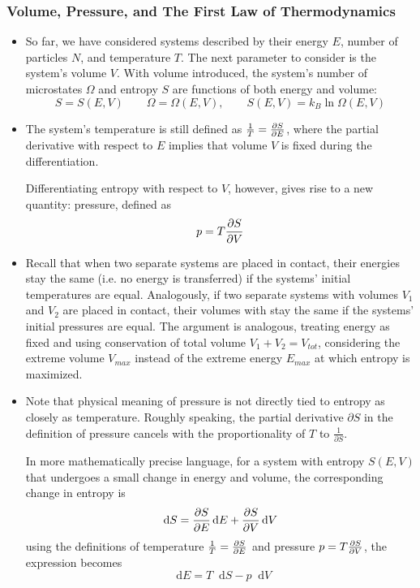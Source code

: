 \documentclass[11pt, a4paper]{article}
\newcommand{\diff}{\mathop{}\!\mathrm{d}} %
\begin{document}
\subsubsection{Volume, Pressure, and The First Law of Thermodynamics}
\begin{itemize}
	\item So far, we have considered systems described by their energy $ E $, number of particles $ N $, and temperature $ T $. The next parameter to consider is the system's volume $ V $. With volume introduced, the system's number of microstates $ \Omega $ and entropy $ S $ are functions of both energy and volume:
	\begin{equation*}
		S = S(E, V) \qquad \Omega = \Omega(E, V), \qquad S(E, V) = k_{B}\ln \Omega(E, V)
	\end{equation*}
	
	\item The system's temperature is still defined as $ \frac{1}{T} = \pdv{S}{E} $, where the partial derivative with respect to $ E $ implies that volume $ V $ is fixed during the differentiation. 
	
	Differentiating entropy with respect to $ V $, however, gives rise to a new quantity: pressure, defined as
	\begin{equation*}
		p = T \pdv{S}{V}
	\end{equation*}
	
	\item Recall that when two separate systems are placed in contact, their energies stay the same (i.e. no energy is transferred) if the systems' initial temperatures are equal. Analogously, if two separate systems with volumes $ V_{1} $ and $ V_{2} $ are placed in contact, their volumes with stay the same if the systems' initial pressures are equal. The argument is analogous, treating energy as fixed and using conservation of total volume $ V_{1} + V_{2} = V_{tot} $, considering the extreme volume $ V_{max} $ instead of the extreme energy $ E_{max} $ at which entropy is maximized.
	
	\item Note that physical meaning of pressure is not directly tied to entropy as closely as temperature. Roughly speaking, the partial derivative $ \partial S $ in the definition of pressure cancels with the proportionality of $ T $ to $ \frac{1}{\partial S} $. 
	
	In more mathematically precise language, for a system with entropy $ S(E, V) $ that undergoes a small change in energy and volume, the corresponding change in entropy is
	\begin{equation*}
		\diff S = \pdv{S}{E}\diff E + \pdv{S}{V}\diff V
	\end{equation*}
	using the definitions of temperature $ \frac{1}{T} = \pdv{S}{E} $ and pressure $ p = T\pdv{S}{V} $, the expression becomes
	\begin{equation*}
		\diff E = T\diff S - p \diff V
	\end{equation*}
	

\end{itemize}
\end{document}

